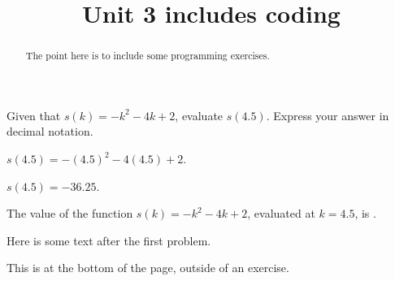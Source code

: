 \documentclass{ximera}
\title{Unit 3 includes coding}
\begin{document}
\begin{abstract}
  The point here is to include some programming exercises.
\end{abstract}

\begin{exercise}
Given that $s(k)=-k^2-4 k+2$, evaluate $s(4.5)$. Express your answer in decimal notation.
\begin{hint}
$s(4.5)=-(4.5)^2-4 (4.5)+2$.
\end{hint}
\begin{hint}
$s(4.5)=-36.25$.
\end{hint}
The value of the function $s(k)=-k^2-4 k+2$, evaluated at $k=4.5$, is .

Here is some text after the first problem.
\end{exercise}


This is at the bottom of the page, outside of an exercise.
\end{document}
